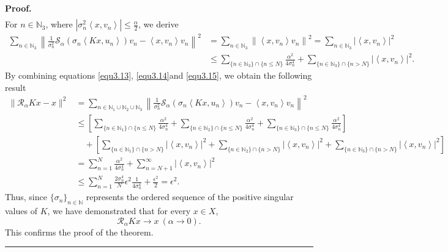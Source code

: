 \documentclass[a4paper,12pt]{article}
\numberwithin{equation}{section}
\newenvironment{proof}[1][Proof]{\textbf{#1.} }
{\ \rule{0.75em}{0.75em}\smallskip}
\begin{document}
\begin{proof}
\begin{align}
    \end{align}
    For $n\in\mathbb{N}_{3}$, where $|\sigma_{n}^{2}\left<x,v_{n}\right>| \leq\frac{\alpha}{2}$, we derive
    \begin{align}\label{equ3.15}
        \sum_{n\in\mathbb{N}_{3}}\left\|\frac{1}{\sigma_{n}^2}\mathcal{S}_{\alpha}(\sigma_{n}\left<Kx,u_{n}\right>)v_{n}-\left<x,v_{n}\right>v_{n}\right\|^2
        & =\sum_{n\in\mathbb{N}_{3}}\left\|\left<x,v_{n}\right>v_{n}\right\|^{2}=\sum_{n\in\mathbb{N}_{3}}|\left<x,v_{n}\right>|^2 \nonumber\\
        & \leq \sum_{\{n\in\mathbb{N}_{3}\}\cap\{n\leq N\}}\frac{\alpha^{2}}{4\sigma_{n}^{4}}+\sum_{\{n\in\mathbb{N}_{3}\}\cap \{n> N\}}|\left<x,v_{n}\right>|^{2}.
    \end{align} 
    By combining equations \eqref{equ3.13}, \eqref{equ3.14}and \eqref{equ3.15}, we obtain the following result
    \begin{align*}
        \|\mathcal{R}_{\alpha}Kx-x\|^2
        & = \sum_{n\in\mathbb{N}_{1}\cup\mathbb{N}_{2}\cup\mathbb{N}_{3}} \left\|\frac{1}{\sigma_{n}^2}\mathcal{S}_{\alpha}(\sigma_{n}\left<Kx,u_{n}\right>)v_{n}-\left<x,v_{n}\right>v_{n}\right\|^2 \nonumber\\
        & \leq \left[\sum_{\{n\in\mathbb{N}_{1}\}\cap\{n\leq N\}}\frac{\alpha^{2}}{4\sigma_{n}^{4}}+\sum_{\{n\in\mathbb{N}_{2}\}\cap \{n\leq N\}}\frac{\alpha^{2}}{4\sigma_{n}^{4}}+\sum_{\{n\in\mathbb{N}_{3}\}\cap \{n\leq N\}}\frac{\alpha^{2}}{4\sigma_{n}^{4}}\right] \nonumber\\
        & \quad +\left[\sum_{\{n\in\mathbb{N}_{1}\}\cap\{n> N\}}|\left<x,v_{n}\right>|^{2}+\sum_{\{n\in\mathbb{N}_{2}\}\cap\{n> N\}}|\left<x,v_{n}\right>|^{2}+\sum_{\{n\in\mathbb{N}_{3}\}\cap\{n> N\}}|\left<x,v_{n}\right>|^{2}\right] \nonumber\\
        & = \sum_{n=1}^{N}\frac{\alpha^{2}}{4\sigma_{n}^{4}}+\sum_{n=N+1}^{\infty}|\left<x,v_{n}\right>|^{2} \nonumber\\
        & \leq \sum_{n=1}^{N}\frac{2\sigma_{n}^{4}}{N}\epsilon^{2} \frac{1}{4\sigma_{n}^{4}}+\frac{\epsilon^{2}}{2}= \epsilon^{2}.
    \end{align*}
    Thus, since $\{\sigma_{n}\}_{n\in\mathbb{N}}$ represents the ordered sequence of the positive singular values of $K$, we have demonstrated that for every $x\in X$,
    \begin{equation*}
        \mathcal{R}_{\alpha}Kx\rightarrow x\ (\alpha\rightarrow 0).
    \end{equation*}
    This confirms the proof of the theorem.
\end{proof}
\end{document}
